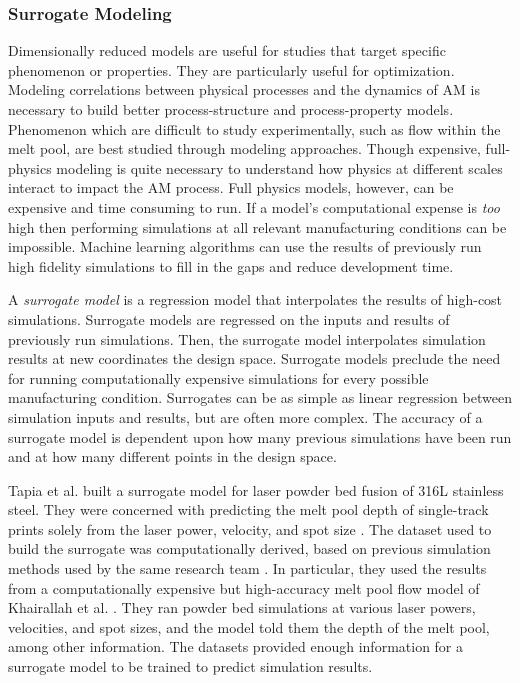 \subsubsection{Surrogate Modeling}
Dimensionally reduced models are useful for studies that target specific phenomenon or properties. They are particularly useful for optimization. Modeling correlations between physical processes and the dynamics of AM is necessary to build better process-structure and process-property models. Phenomenon which are difficult to study experimentally, such as flow within the melt pool, are best studied through modeling approaches. Though expensive, full-physics modeling is quite necessary to understand how physics at different scales interact to impact the AM process. Full physics models, however, can be expensive and time consuming to run.  If a model's computational expense is \textit{too} high then performing simulations at all relevant manufacturing conditions can be impossible. Machine learning algorithms can use the results of previously run high fidelity simulations to fill in the gaps and reduce development time.

A \textit{surrogate model} is a regression model that interpolates the results of high-cost simulations. Surrogate models are regressed on the inputs and results of previously run simulations. Then, the surrogate model interpolates simulation results at new coordinates the design space. Surrogate models preclude the need for running computationally expensive simulations for every possible manufacturing condition. Surrogates can be as simple as linear regression between simulation inputs and results, but are often more complex. The accuracy of a surrogate model is dependent upon how many previous simulations have been run and at how many different points in the design space.

Tapia et al. built a surrogate model for laser powder bed fusion of 316L stainless steel. They were concerned with predicting the melt pool depth of single-track prints solely from the laser power, velocity, and spot size \cite{Tapia2017}. The dataset used to build the surrogate was computationally derived, based on previous simulation methods used by the same research team \cite{King2014}. In particular, they used the results from a computationally expensive but high-accuracy melt pool flow model of Khairallah et al. \cite{Khairallah2016}. They ran powder bed simulations at various laser powers, velocities, and spot sizes, and the model told them the depth of the melt pool, among other information. The datasets provided enough information for a surrogate model to be trained to predict simulation results.

